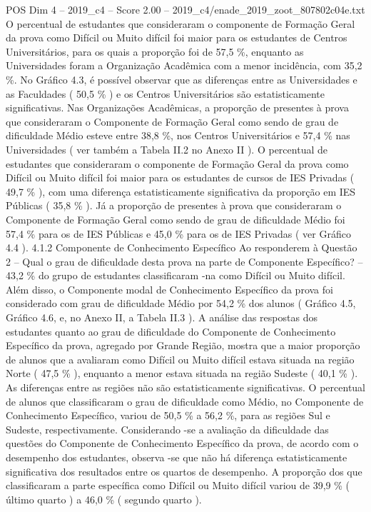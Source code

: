 \begin{textsample}{POS Dim 4 – 2019\_c4 – Score 2.00 – 2019\_c4/enade\_2019\_zoot\_807802c04e.txt}
O percentual de estudantes que consideraram o componente de Formação Geral da prova como Difícil ou Muito difícil foi maior para os estudantes de Centros Universitários, para os quais a proporção foi de 57,5 \%, enquanto as Universidades foram a Organização Acadêmica com a menor incidência, com 35,2 \%.
No Gráfico 4.3, é possível observar que as diferenças entre as Universidades e as Faculdades ( 50,5 \% ) e os Centros Universitários são estatisticamente significativas.
Nas Organizações Acadêmicas, a proporção de presentes à prova que consideraram o Componente de Formação Geral como sendo de grau de dificuldade Médio esteve entre 38,8 \%, nos Centros Universitários e 57,4 \% nas Universidades ( ver também a Tabela II.2 no Anexo II ).
O percentual de estudantes que consideraram o componente de Formação Geral da prova como Difícil ou Muito difícil foi maior para os estudantes de cursos de IES Privadas ( 49,7 \% ), com uma diferença estatisticamente significativa da proporção em IES Públicas ( 35,8 \% ).
Já a proporção de presentes à prova que consideraram o Componente de Formação Geral como sendo de grau de dificuldade Médio foi 57,4 \% para os de IES Públicas e 45,0 \% para os de IES Privadas ( ver Gráfico 4.4 ). 4.1.2 Componente de Conhecimento Específico Ao responderem à Questão 2 – Qual o grau de dificuldade desta prova na parte de Componente Específico? – 43,2 \% do grupo de estudantes classificaram -na como Difícil ou Muito difícil.
Além disso, o Componente modal de Conhecimento Específico da prova foi considerado com grau de dificuldade Médio por 54,2 \% dos alunos ( Gráfico 4.5, Gráfico 4.6, e, no Anexo II, a Tabela II.3 ).
A análise das respostas dos estudantes quanto ao grau de dificuldade do Componente de Conhecimento Específico da prova, agregado por Grande Região, mostra que a maior proporção de alunos que a avaliaram como Difícil ou Muito difícil estava situada na região Norte ( 47,5 \% ), enquanto a menor estava situada na região Sudeste ( 40,1 \% ).
As diferenças entre as regiões não são estatisticamente significativas.
O percentual de alunos que classificaram o grau de dificuldade como Médio, no Componente de Conhecimento Específico, variou de 50,5 \% a 56,2 \%, para as regiões Sul e Sudeste, respectivamente.
Considerando -se a avaliação da dificuldade das questões do Componente de Conhecimento Específico da prova, de acordo com o desempenho dos estudantes, observa -se que não há diferença estatisticamente significativa dos resultados entre os quartos de desempenho.
A proporção dos que classificaram a parte específica como Difícil ou Muito difícil variou de 39,9 \% ( último quarto ) a 46,0 \% ( segundo quarto ).

\end{textsample}
